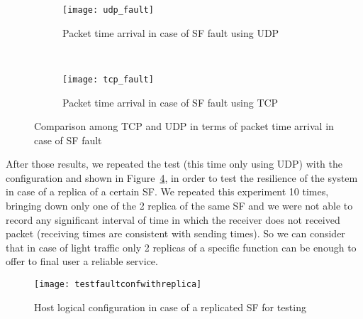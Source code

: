 \begin{figure}[]
    \begin{subfigure}[b]{0.9\textwidth}
        \texttt{[image: udp\_fault]}
        \caption{Packet time arrival in case of SF fault using UDP}
        \label{chap:tests:sec:fault:img:faultgraphudp}
    \end{subfigure}
    \\
    \begin{subfigure}[b]{0.9\textwidth}
        \texttt{[image: tcp\_fault]}
        \caption{Packet time arrival in case of SF fault using TCP}
        \label{chap:tests:sec:fault:img:faultgraphtcp}
    \end{subfigure}
    \caption{Comparison among TCP and UDP in terms of packet time arrival in
    case of SF fault}
    \label{chap:tests:sec:fault:img:faultgrapht}
\end{figure}

After those results, we repeated the test (this time only using UDP) with the
configuration and shown in
Figure~\ref{chap:tests:sec:fault:img:testfaultconfwithreplica}, in order to
test the resilience of the system in case of a replica of a certain SF. We
repeated this experiment 10 times, bringing down only one of the 2 replica of
the same SF and we were not able to record any significant interval of time in
which the receiver does not received packet (receiving times are consistent
with sending times). So we can consider that in case of light traffic only 2
replicas of a specific function can be enough to offer to final user a reliable
service.

\begin{figure}[H]
  \centering
  \texttt{[image: testfaultconfwithreplica]}
  \caption{Host logical configuration in case of a replicated SF for testing}
  \label{chap:tests:sec:fault:img:testfaultconfwithreplica}
\end{figure}